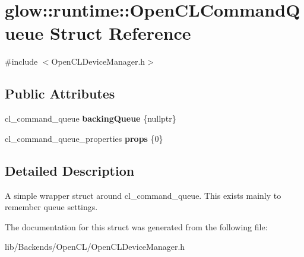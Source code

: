 \hypertarget{structglow_1_1runtime_1_1_open_c_l_command_queue}{}\section{glow\+:\+:runtime\+:\+:Open\+C\+L\+Command\+Queue Struct Reference}
\label{structglow_1_1runtime_1_1_open_c_l_command_queue}


{\ttfamily \#include $<$Open\+C\+L\+Device\+Manager.\+h$>$}

\subsection*{Public Attributes}
\begin{DoxyCompactItemize}
\item 
\mbox{\label{structglow_1_1runtime_1_1_open_c_l_command_queue_a3c69f34ac3f3079133153a5a793745a1}} 
cl\+\_\+command\+\_\+queue {\bfseries backing\+Queue} \{nullptr\}
\item 
\mbox{\label{structglow_1_1runtime_1_1_open_c_l_command_queue_add8b4b7dbaf7d65f1e70b1c9af062d25}} 
cl\+\_\+command\+\_\+queue\+\_\+properties {\bfseries props} \{0\}
\end{DoxyCompactItemize}


\subsection{Detailed Description}
A simple wrapper struct around cl\+\_\+command\+\_\+queue. This exists mainly to remember queue settings. 

The documentation for this struct was generated from the following file\+:\begin{DoxyCompactItemize}
\item 
lib/\+Backends/\+Open\+C\+L/Open\+C\+L\+Device\+Manager.\+h\end{DoxyCompactItemize}
